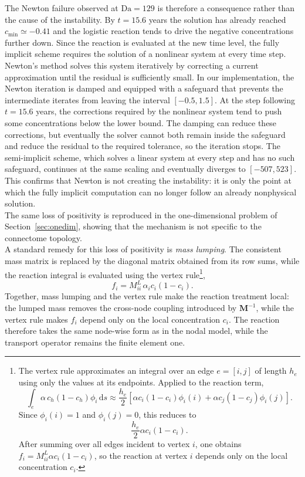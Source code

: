 The Newton failure observed at $\mathrm{Da}=129$ is therefore a consequence rather than the cause of the instability. By $t=15.6$ years the solution has already reached $c_{\min}\simeq-0.41$ and the logistic reaction tends to drive the negative concentrations further down. Since the reaction is evaluated at the new time level, the fully implicit scheme requires the solution of a nonlinear system at every time step. Newton's method solves this system iteratively by correcting a current approximation until the residual is sufficiently small. In our implementation, the Newton iteration is damped and equipped with a safeguard that prevents the intermediate iterates from leaving the interval $[-0.5,1.5]$. At the step following $t=15.6$ years, the corrections required by the nonlinear system tend to push some concentrations below the lower bound. The damping can reduce these corrections, but eventually the solver cannot both remain inside the safeguard and reduce the residual to the required tolerance, so the iteration stops. The semi-implicit scheme, which solves a linear system at every step and has no such safeguard, continues at the same scaling and eventually diverges to $[-507,523]$. This confirms that Newton is not creating the instability: it is only the point at which the fully implicit computation can no longer follow an already nonphysical solution.\\
The same loss of positivity is reproduced in the one-dimensional problem of Section~\ref{sec:onedim}, showing that the mechanism is not specific to the connectome topology.\\
A standard remedy for this loss of positivity is \emph{mass lumping}. The consistent mass matrix is replaced by the diagonal matrix obtained from its row sums, while the reaction integral is evaluated using the vertex rule\footnote{The vertex rule approximates an integral over an edge $e=[i,j]$ of length $h_e$ using only the values at its endpoints. Applied to the reaction term,
\[
\int_e \alpha\,c_h(1-c_h)\phi_i\,\mathrm{d}s
\approx
\frac{h_e}{2}\left[
\alpha c_i(1-c_i)\phi_i(i)
+
\alpha c_j(1-c_j)\phi_i(j)
\right].
\]
Since $\phi_i(i)=1$ and $\phi_i(j)=0$, this reduces to
\[
\frac{h_e}{2}\alpha c_i(1-c_i).
\]
After summing over all edges incident to vertex $i$, one obtains
$f_i=M_{ii}^{L}\alpha c_i(1-c_i)$, so the reaction at vertex $i$ depends only on the local concentration $c_i$.
},
\[
f_i
=
M^L_{ii}\,\alpha_i c_i(1-c_i).
\]
Together, mass lumping and the vertex rule make the reaction treatment local: the lumped mass removes the cross-node coupling introduced by $\mathbf{M}^{-1}$, while the vertex rule makes $f_i$ depend only on the local concentration $c_i$. The reaction therefore takes the same node-wise form as in the nodal model, while the transport operator remains the finite element one.\\
